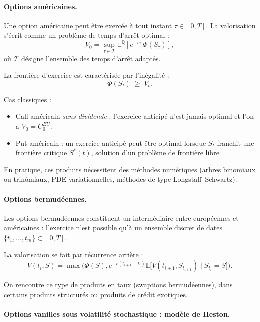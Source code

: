 \documentclass[11pt,a4paper]{article}
\newcommand{\1}{\mathbf{1}}
\begin{document}
\paragraph{Options américaines.}

Une option américaine peut être exercée à tout instant $\tau \in [0,T]$.
La valorisation s'écrit comme un problème de temps d'arrêt optimal :
\[
V_0 = \sup_{\tau \in \mathcal{T}}
\mathbb{E}^{\mathbb{Q}}\!\left[e^{-r\tau}\,\Phi(S_\tau)\right],
\]
où $\mathcal{T}$ désigne l'ensemble des temps d'arrêt adaptés.

La frontière d'exercice est caractérisée par l'inégalité :
\[
\Phi(S_t) \;\ge\; V_t.
\]

Cas classiques :
\begin{itemize}
  \item Call américain \emph{sans dividende} : l'exercice anticipé n'est jamais optimal et l'on a
  $V_0 = C_0^{EU}$.
  \item Put américain : un exercice anticipé peut être optimal lorsque $S_t$ franchit une
  frontière critique $S^*(t)$, solution d'un problème de frontière libre.
\end{itemize}

En pratique, ces produits nécessitent des méthodes numériques (arbres binomiaux ou
trinômiaux, PDE variationnelles, méthodes de type Longstaff--Schwartz).

\paragraph{Options bermudéennes.}

Les options bermudéennes constituent un intermédiaire entre européennes et américaines :
l'exercice n'est possible qu'à un ensemble discret de dates
$\{t_1,\dots,t_m\} \subset [0,T]$.

La valorisation se fait par récurrence arrière :
\[
V(t_i,S)
=
\max\Big(
\Phi(S),
e^{-r (t_{i+1}-t_i)}
\mathbb{E}\big[ V(t_{i+1},S_{t_{i+1}})\mid S_{t_i}=S \big]
\Big).
\]

On rencontre ce type de produits en taux (swaptions bermudéennes), dans certains produits
structurés ou produits de crédit exotiques.

\paragraph{Options vanilles sous volatilité stochastique : modèle de Heston.}
\end{document}
